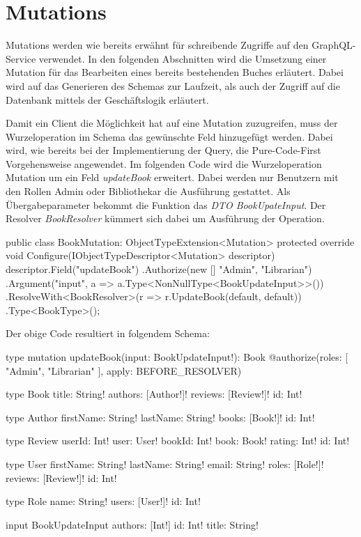 \section{Mutations}
Mutations werden wie bereits erwähnt für schreibende Zugriffe auf den GraphQL-Service verwendet.
In den folgenden Abschnitten wird die Umsetzung einer Mutation für das Bearbeiten eines bereits bestehenden Buches erläutert.
Dabei wird auf das Generieren des Schemas zur Laufzeit, als auch der Zugriff auf die Datenbank mittels der Geschäftslogik erläutert.

Damit ein Client die Möglichkeit hat auf eine Mutation zuzugreifen, muss der Wurzeloperation im Schema das gewünschte Feld hinzugefügt werden.
Dabei wird, wie bereits bei der Implementierung der Query, die Pure-Code-First Vorgehensweise angewendet.
\newline
Im folgenden Code wird die Wurzeloperation Mutation um ein Feld \textit{updateBook} erweitert.
Dabei werden nur Benutzern mit den Rollen Admin oder Bibliothekar die Ausführung gestattet.
Als Übergabeparameter bekommt die Funktion das \textit{DTO BookUpateInput}.
Der Resolver \textit{BookResolver} kümmert sich dabei um Ausführung der Operation.

\begin{JsCode}
public class BookMutation: ObjectTypeExtension<Mutation>{
    protected override void Configure(IObjectTypeDescriptor<Mutation> descriptor) {
        descriptor.Field("updateBook")
            .Authorize(new [] {"Admin", "Librarian"})
            .Argument("input", a => a.Type<NonNullType<BookUpdateInput>>())
            .ResolveWith<BookResolver>(r => r.UpdateBook(default, default))
            .Type<BookType>();
    }
}
\end{JsCode}

Der obige Code resultiert in folgendem Schema:
\begin{JsCode}
type mutation{
    updateBook(input: BookUpdateInput!): Book @authorize(roles: [ "Admin", "Librarian" ], apply: BEFORE_RESOLVER)
}

type Book {
  title: String!
  authors: [Author!]!
  reviews: [Review!]!
  id: Int!
}

type Author {
  firstName: String!
  lastName: String!
  books: [Book!]!
  id: Int!
}

type Review {
  userId: Int!
  user: User!
  bookId: Int!
  book: Book!
  rating: Int!
  id: Int!
}

type User {
  firstName: String!
  lastName: String!
  email: String!
  roles: [Role!]!
  reviews: [Review!]!
  id: Int!
}

type Role {
  name: String!
  users: [User!]!
  id: Int!
}

input BookUpdateInput {
  authors: [Int!]
  id: Int!
  title: String!
}
\end{JsCode}

